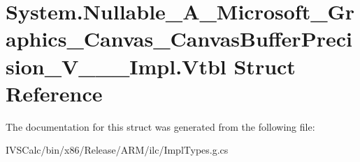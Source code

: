 \hypertarget{struct_system_1_1_nullable___a___microsoft___graphics___canvas___canvas_buffer_precision___v_______impl_1_1_vtbl}{}\section{System.\+Nullable\+\_\+\+A\+\_\+\+Microsoft\+\_\+\+Graphics\+\_\+\+Canvas\+\_\+\+Canvas\+Buffer\+Precision\+\_\+\+V\+\_\+\+\_\+\+\_\+\+Impl.\+Vtbl Struct Reference}
\label{struct_system_1_1_nullable___a___microsoft___graphics___canvas___canvas_buffer_precision___v_______impl_1_1_vtbl}


The documentation for this struct was generated from the following file\+:\begin{DoxyCompactItemize}
\item 
I\+V\+S\+Calc/bin/x86/\+Release/\+A\+R\+M/ilc/Impl\+Types.\+g.\+cs\end{DoxyCompactItemize}
